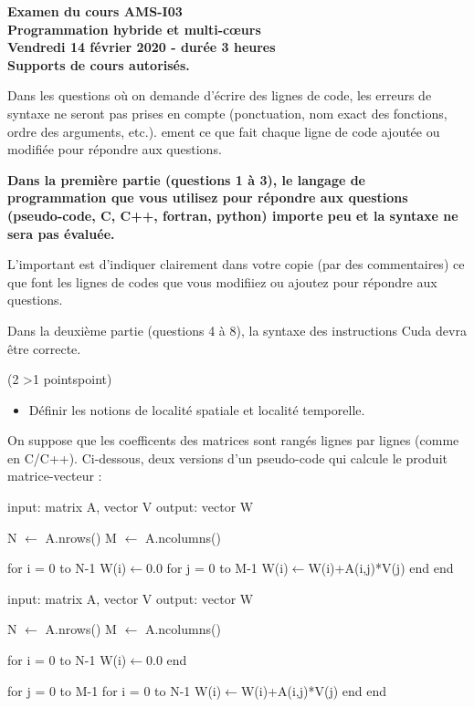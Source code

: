 \documentclass[12pt]{report}
\newcounter{cptPoints}
\newcounter{cptQuestions}
\newcommand\question[2]{\bigskip\par\addtocounter{cptQuestions}{1}\addtocounter{cptPoints}{#2}{\bf Question #1 n\textsuperscript{o} \thecptQuestions} (#2 \ifnum #2>1 points\else point\fi)\par}
\begin{document}
	\begin{center}\Large\bf
			Examen du cours AMS-I03\\
			Programmation hybride et multi-c\oe urs\\[0.4cm]
			Vendredi 14 f\'evrier 2020 - dur\'ee 3 heures\\
			Supports de cours autoris\'es.
		\end{center}
	\bigskip
	Dans les questions o\`u on demande d'\'ecrire des lignes de code, les erreurs de syntaxe ne seront pas prises en compte (ponctuation, nom exact des fonctions, ordre des arguments, etc.). ement ce que fait chaque ligne de code ajout\'ee ou modifi\'ee pour r\'epondre aux questions.
		
	{\bf Dans la premi\`ere partie (questions 1 \`a 3), le langage de programmation que vous utilisez pour r\'epondre aux questions (pseudo-code, C, C++, fortran, python) importe peu et la syntaxe ne sera pas \'evalu\'ee.
	
	L'important est d'indiquer clairement dans votre copie (par des commentaires) ce que font les lignes de codes que vous modifiiez ou ajoutez pour r\'epondre aux questions.
	
	Dans la deuxi\`eme partie (questions 4 \`a 8), la syntaxe des instructions Cuda devra \^etre correcte.}
	
	\question{}2
	\medskip
	
	\begin{itemize}
		\item D\'efinir les notions de localit\'e spatiale et localité temporelle.
	\end{itemize}
	
	On suppose que les coefficents des matrices sont rang\'es lignes par lignes (comme en C/C++).
	Ci-dessous, deux versions d'un pseudo-code qui calcule le produit matrice-vecteur :
	
\vspace{-10pt}
\begin{minipage}[t]{0.5\textwidth}
\begin{algorithm}
input: matrix A, vector V
output: vector W
	
N $\gets$ A.nrows()
M $\gets$ A.ncolumns()

for i = 0 to N-1
   W(i)$\gets$0.0
   for j = 0 to M-1
      W(i)$\gets$W(i)+A(i,j)*V(j)
   end
end       
\end{algorithm}
\end{minipage}
\begin{minipage}[t]{0.5\textwidth}
\begin{algorithm}
input: matrix A, vector V
output: vector W

N $\gets$ A.nrows()
M $\gets$ A.ncolumns()

for i = 0 to N-1
   W(i)$\gets$0.0
end

for j = 0 to M-1
   for i = 0 to N-1
       W(i)$\gets$W(i)+A(i,j)*V(j)
   end
end       
\end{algorithm}
\end{minipage}
\end{document}
